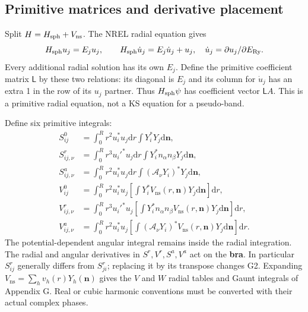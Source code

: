 \documentclass[11pt]{article}
\newcommand{\dd}{\mathrm d}
\newcommand{\ns}{\mathrm{ns}}
\begin{document}
\subsection{Primitive matrices and derivative placement}
Split $H=H_{\rm sph}+V_\ns$. The NREL radial equation gives
\begin{equation}
 H_{\rm sph}u_j=E_j u_j,\qquad
 H_{\rm sph}\dot u_j=E_j\dot u_j+u_j,
 \quad \dot u_j=\partial u_j/\partial E_{\rm Ry}.
\end{equation}
Every additional radial solution has its own $E_j$. Define the primitive coefficient matrix $\mathsf L$ by these two relations: its diagonal is $E_j$ and its column for $\dot u_j$ has an extra 1 in the row of its $u_j$ partner. Thus $H_{\rm sph}\psi$ has coefficient vector $\mathsf L A$. This is a primitive radial equation, not a KS equation for a pseudo-band.

Define six primitive integrals:
\begin{align}
 S^0_{ij}&=\int_0^Rr^2u_i^*u_j\dd r\int Y_i^*Y_j\dd\bm n,\\
 S^r_{ij,\nu}&=\int_0^Rr^3u_i'^*u_j\dd r\int Y_i^* n_\alpha n_\beta Y_j\dd\bm n,\\
 S^a_{ij,\nu}&=\int_0^Rr^2u_i^*u_j\dd r\int(\mathcal A_\nu Y_i)^*Y_j\dd\bm n,\\
 V^0_{ij}&=\int_0^Rr^2u_i^*u_j\left[\int Y_i^*V_\ns(r,\bm n)Y_j\dd\bm n\right]\dd r,\\
 V^r_{ij,\nu}&=\int_0^Rr^3u_i'^*u_j\left[\int Y_i^*n_\alpha n_\beta V_\ns(r,\bm n)Y_j\dd\bm n\right]\dd r,\\
 V^a_{ij,\nu}&=\int_0^Rr^2u_i^*u_j\left[\int(\mathcal A_\nu Y_i)^*V_\ns(r,\bm n)Y_j\dd\bm n\right]\dd r.
\end{align}
The potential-dependent angular integral remains inside the radial integration. The radial and angular derivatives in $S^r,V^r,S^a,V^a$ act on the \textbf{bra}. In particular $S^r_{ij}$ generally differs from $S^r_{ji}$; replacing it by its transpose changes G2. Expanding $V_\ns=\sum_hv_h(r)Y_h(\bm n)$ gives the $V$ and $W$ radial tables and Gaunt integrals of Appendix G. Real or cubic harmonic conventions must be converted with their actual complex phases.
\end{document}
